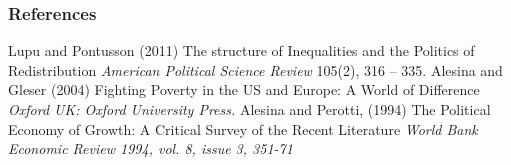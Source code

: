 \documentclass{beamer}
\begin{document}
\begin{frame}
\frametitle{References}
\footnotesize{
\begin{thebibliography}{99} %
 Lupu and Pontusson (2011)
\newblock The structure of Inequalities and the Politics of Redistribution
\newblock \emph{American Political Science Review} 105(2), 316 -- 335.
 Alesina and Gleser (2004)
\newblock Fighting Poverty in the US and Europe: A World of Difference
\newblock \emph{Oxford UK: Oxford University Press.} 
 Alesina and Perotti, (1994)
\newblock The Political Economy of Growth: A Critical Survey of the Recent Literature
\newblock \emph{World Bank Economic Review 1994, vol. 8, issue 3, 351-71} 


\end{thebibliography}
}
\end{frame}
\end{document}
